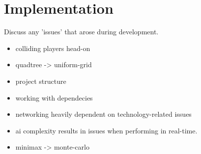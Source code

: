 \documentclass{standalone}
\begin{document}
	\section{Implementation}
		Discuss any 'issues' that arose during development.

		\begin{itemize}
			\item colliding players head-on
			\item quadtree -> uniform-grid
			\item project structure
			\item working with dependecies
			\item networking heavily dependent on technology-related issues
			\item ai complexity results in issues when performing in real-time.
			\item minimax -> monte-carlo
		\end{itemize}
\end{document}
